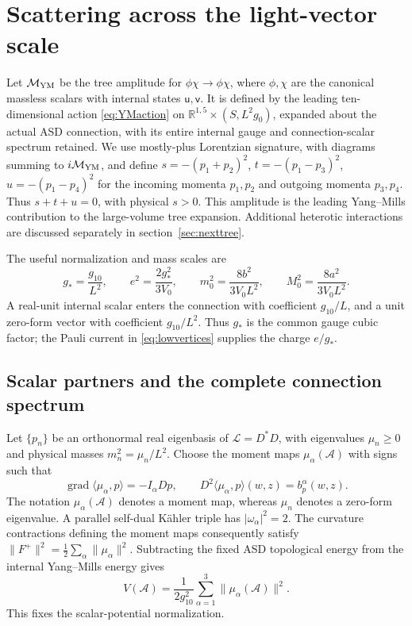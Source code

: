 \section{Scattering across the light-vector scale}\label{sec:scattering}

Let $\mathcal M_{\rm YM}$ be the tree amplitude for
$\phi\chi\to\phi\chi$, where $\phi,\chi$ are the canonical massless
scalars with internal states $\mathsf u,\mathsf v$. It is defined by the
leading ten-dimensional action \eqref{eq:YMaction} on
$\mathbb R^{1,5}\times(S,L^2g_0)$, expanded about the actual ASD
connection, with its entire internal gauge and connection-scalar
spectrum retained. We use mostly-plus Lorentzian signature, with diagrams
summing to $i\mathcal M_{\rm YM}$, and define
$s=-(p_1+p_2)^2$, $t=-(p_1-p_3)^2$, $u=-(p_1-p_4)^2$ for the
incoming momenta $p_1,p_2$ and outgoing momenta $p_3,p_4$. Thus
$s+t+u=0$, with physical $s>0$. This amplitude is the leading Yang--Mills contribution to
the large-volume tree expansion. Additional heterotic interactions are
discussed separately in section~\ref{sec:nexttree}.

The useful normalization and mass scales are
\begin{equation}\label{eq:scatteringscales}
 g_* =\frac{g_{10}}{L^2},\qquad e^2=\frac{2g_*^2}{3V_0},\qquad
 m_0^2=\frac{8b^2}{3V_0L^2},\qquad M_0^2=\frac{8a^2}{3V_0L^2}.
\end{equation}
A real-unit internal scalar enters the connection with coefficient
$g_{10}/L$, and a unit zero-form vector with coefficient $g_{10}/L^2$.
Thus $g_*$ is the common gauge cubic factor; the Pauli current in
\eqref{eq:lowvertices} supplies the charge $e/g_*$.

\subsection{Scalar partners and the complete connection spectrum}
Let $\{p_n\}$ be an orthonormal real eigenbasis of
$\mathcal L=D^*D$, with eigenvalues $\mu_n\ge0$ and physical masses
$m_n^2=\mu_n/L^2$. Choose the moment maps $\mu_\alpha(\mathcal A)$
with signs such that
\begin{equation}\label{eq:infinitemoments}
 \operatorname{grad}\langle\mu_\alpha,p\rangle=-I_\alpha Dp,
 \qquad D^2\langle\mu_\alpha,p\rangle(w,z)=b_p^\alpha(w,z).
\end{equation}
The notation $\mu_\alpha(\mathcal A)$ denotes a moment map, whereas
$\mu_n$ denotes a zero-form eigenvalue. A parallel self-dual K\"ahler
triple has $|\omega_\alpha|^2=2$. The curvature contractions defining
the moment maps consequently satisfy
$\|F^+\|^2=\tfrac12\sum_\alpha\|\mu_\alpha\|^2$. Subtracting
the fixed ASD topological energy from the internal Yang--Mills energy gives
\begin{equation}\label{eq:momentpotential}
 V(\mathcal A)=\frac1{2g_{10}^2}
                  \sum_{\alpha=1}^3\|\mu_\alpha(\mathcal A)\|^2.
\end{equation}
This fixes the scalar-potential normalization.

